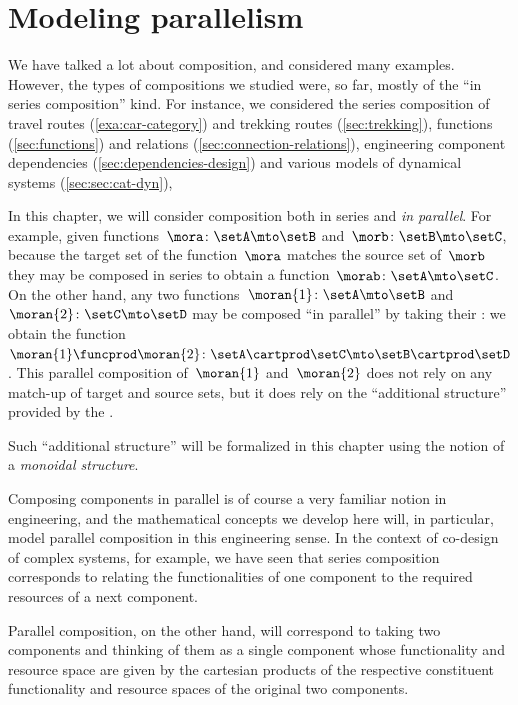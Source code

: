 
\section{Modeling parallelism}
\label{sec:modeling-parallelism}

We have talked a lot about composition, and considered many examples.
However, the types of compositions we studied were, so far, mostly of the ``in series composition'' kind.
For instance, we considered the series composition of travel routes (\cref{exa:car-category}) and trekking routes (\cref{sec:trekking}), functions (\cref{sec:functions}) and relations (\cref{sec:connection-relations}), engineering component dependencies (\cref{sec:dependencies-design}) and various models of dynamical systems  (\cref{sec:sec:cat-dyn}), \etc

In this chapter, we will consider composition both in series and \emph{in parallel}.
For example, given functions~$\mora\colon \setA \mto \setB$ and~$\morb\colon \setB \mto \setC$, because the target set of the function~$\mora$ matches the source set of~$\morb$ they may be composed in series to obtain a function~$\morab\colon \setA \mto \setC$.
On the other hand, any two functions~$\moran{1} \colon \setA \mto \setB$ and~$\moran{2} \colon \setC \mto \setD$ may be composed ``in parallel'' by taking their : we obtain the function~$\moran{1} \funcprod \moran{2}\colon \setA \cartprod \setC \mto \setB \cartprod \setD$.
This parallel composition of~$\moran{1}$ and~$\moran{2}$ does not rely on any match-up of target and source sets, but it does rely on the ``additional structure'' provided by the .

Such ``additional structure'' will be formalized in this chapter using the notion of a \emph{monoidal structure}.

Composing components in parallel is of course a very familiar notion in engineering, and the mathematical concepts we develop here will, in particular, model parallel composition in this engineering sense.
In the context of co-design of complex systems, for example, we have seen that series composition corresponds to relating the functionalities of one component to the required resources of a next component.


Parallel composition, on the other hand, will correspond to taking two components and thinking of them as a single component whose functionality and resource space are given by the cartesian products of the respective constituent functionality and resource spaces of the original two components.

